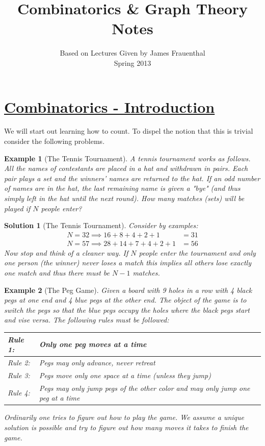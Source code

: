 \documentclass[12pt, letterpaper, onecolumn, conference, final]{IEEEtran}
\title{Combinatorics \& Graph Theory Notes}
\author{Based on Lectures Given by James Frauenthal \\ Spring 2013}
\makeatletter
\theoremstyle{definition}
\theoremstyle{plain}
\newtheorem{example}{Example}[section]
\newtheorem{solution}{Solution}[section]
\renewcommand\tableofcontents{%
  \null\hfill\textbf{\Large\contentsname}\hfill\null\par
  \@mkboth{\MakeUppercase\contentsname}{\MakeUppercase\contentsname}%
  \@starttoc{toc}%
}
\makeatother
\begin{document}
\maketitle

\tableofcontents

\newpage

\setcounter{page}{1}

\section{\textbf{\underline{Combinatorics - Introduction}}}
\vspace{.3cm}
\noindent
We will start out learning how to count. To dispel the notion that this is trivial consider the following problems.

\begin{example}[The Tennis Tournament]
A tennis tournament works as follows. All the names of contestants are placed in a hat and withdrawn in pairs. Each pair plays a set and the winners' names are returned to the hat. If an odd number of names are in the hat, the last remaining name is given a "bye" (and thus simply left in the hat until the next round). How many matches (sets) will be played if $N$ people enter?
\end{example}
\begin{solution}[The Tennis Tournament]
Consider by examples:
\begin{eqnarray}
N=32 \implies 16+8+4+2+1&=31 \nonumber \\
N=57 \implies 28+14+7+4+2+1&=56 \nonumber
\end{eqnarray}
Now stop and think of a cleaner way. If $N$ people enter the tournament and only one person (the winner) never loses a match this implies all others lose exactly one match and thus there must be $N-1$ matches.
\end{solution}

\begin{example}[The Peg Game]
Given a board with 9 holes in a row with 4 black pegs at one end and 4 blue pegs at the other end. The object of the game is to switch the pegs so that the blue pegs occupy the holes where the black pegs start and vise versa. The following rules must be followed:
\begin{center}
\begin{tabular}{| l | l |}
\hline
Rule 1: & Only one peg moves at a time \\ \hline
Rule 2: & Pegs may only advance, never retreat \\ \hline
Rule 3: & Pegs move only one space at a time (unless they jump) \\ \hline
Rule 4: & Pegs may only jump pegs of the other color and may only jump one peg at a time \\ \hline
\end{tabular}
\end{center}
Ordinarily one tries to figure out how to play the game. We assume a unique solution is possible and try to figure out how many moves it takes to finish the game.
\end{example}
\end{document}
